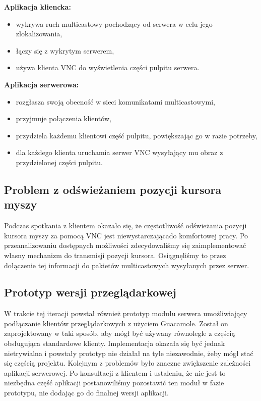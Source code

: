     \textbf{Aplikacja kliencka:}
    \begin{itemize}[noitemsep,nolistsep]
      \item wykrywa ruch multicastowy pochodzący od serwera w celu jego zlokalizowania,
      \item łączy się z wykrytym serwerem,
      \item używa klienta VNC do wyświetlenia części pulpitu serwera.
    \end{itemize}

    \textbf{Aplikacja serwerowa:}
    \begin{itemize}[noitemsep,nolistsep]
      \item rozgłasza swoją obecność w sieci komunikatami multicastowymi,
      \item przyjmuje połączenia klientów,
      \item przydziela każdemu klientowi część pulpitu, powiększając go w razie potrzeby,
      \item dla każdego klienta uruchamia serwer VNC wysyłający mu obraz z przydzielonej części pulpitu.
    \end{itemize}

  \subsection{Problem z odświeżaniem pozycji kursora myszy}

    Podczas spotkania z klientem okazało się, że częstotliwość odświeżania pozycji kursora myszy za pomocą VNC jest niewystarczającado komfortowej pracy. Po przeanalizowaniu dostępnych możliwości zdecydowaliśmy się zaimplementować własny mechanizm do transmisji pozycji kursora. Osiągnęliśmy to przez dołączenie tej informacji do pakietów multicastowych wysyłanych przez serwer.

  \subsection{Prototyp wersji przeglądarkowej}

    W trakcie tej iteracji powstał również prototyp modułu serwera umożliwiający podłączanie klientów przeglądarkowych z użyciem Guacamole. Został on zaprojektowany w taki sposób, aby mógł być używany równolegle z częścią obsługująca standardowe  klienty. Implementacja okazała się być jednak nietrywialna i powstały prototyp nie działał na tyle niezawodnie, żeby mógł stać się częścią projektu. Kolejnym z problemów było znaczne zwiększenie zależności aplikacji serwerowej. Po konsultacji z klientem i ustaleniu, że nie jest to niezbędna część aplikacji postanowiliśmy pozostawić ten moduł w fazie prototypu, nie dodając go do finalnej wersji aplikacji.

